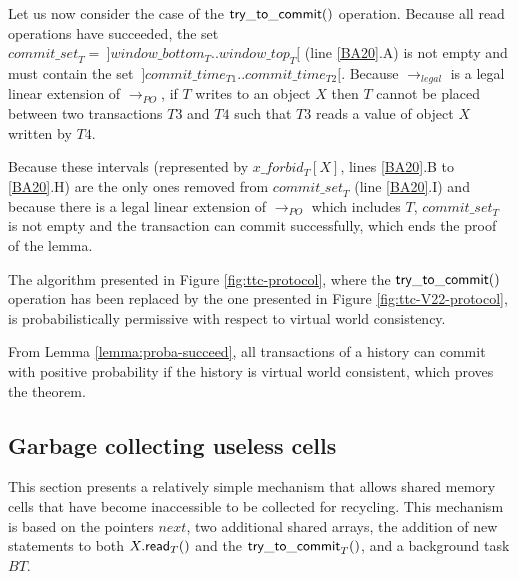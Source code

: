 \begin{proofL}
Let us now consider the case of the $\sf try\_to\_commit()$ operation.
Because all read operations have succeeded, 
the  set  $\mathit{commit\_set}_T  =  ~]window\_bottom_T.. window\_top_T[$
(line \ref{BA20}.A)  is not empty
and must contain the set $~]commit\_time_{T1}.. commit\_time_{T2}[$.
Because   $\rightarrow_{legal}$   is    a   legal   linear   extension   of
$\rightarrow_{PO}$, if $T$ writes to an object $X$ then $T$
 cannot be  placed between two transactions $T3$ and
$T4$ such that $T3$ reads a value of object $X$  written by $T4$. 
 
Because  these intervals  (represented by  $\mathit{x\_forbid_T}[X]$, lines
\ref{BA20}.B to \ref{BA20}.H)
are the only ones removed from $\mathit{commit\_set}_T$ (line \ref{BA20}.I)
and because there is  a legal linear extension of 
$\rightarrow_{PO}$ which includes $T$,
 $\mathit{commit\_set}_T$  is  not empty  and  the  transaction can  commit
successfully,   which ends the proof of the lemma.
\renewcommand{\toto}{lemma:proba-succeed}
\end{proofL}


\begin{theorem}
\label{theo:permissive}
The algorithm presented in Figure \ref{fig:ttc-protocol}, where the 
$\sf try\_to\_commit()$ operation has been replaced by the one presented in 
Figure \ref{fig:ttc-V22-protocol}, is probabilistically permissive 
with respect to virtual world consistency.
\end{theorem}
\begin{proofT}
From Lemma \ref{lemma:proba-succeed}, all transactions of a history can commit 
with positive probability if the history is virtual world consistent, which 
proves the theorem.
\renewcommand{\toto}{theo:permissive}
\end{proofT}




\subsection{Garbage collecting  useless cells} 
\label{sec:garbage-collection}


This section presents a relatively simple mechanism that allows  shared memory 
cells that have become inaccessible to be collected for  recycling. 
This  mechanism is  based on  the  pointers $next$,  two additional  shared
arrays, the addition  of new statements to both  $X.{\sf read}_T()$ and the
${\sf try\_to\_commit}_T()$,  and a background task $BT$. 


